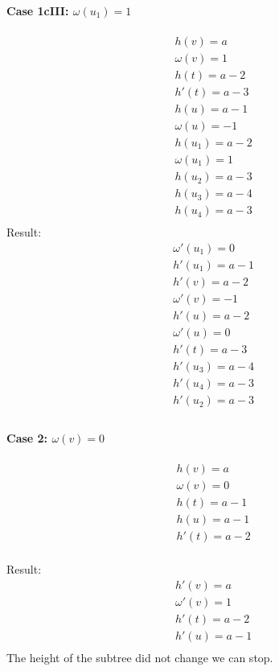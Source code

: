 \paragraph*{\textbf{Case 1cIII}: $\omega(u_1) = 1$}
\[
\begin{split}
& h(v) = a \\
& \omega(v) = 1 \\
& h(t) = a - 2 \\
& h'(t) = a - 3 \\
& h(u) = a - 1 \\
& \omega(u) = - 1 \\
& h(u_1) = a - 2 \\
& \omega(u_1) = 1 \\
& h(u_2) = a - 3 \\
& h(u_3) = a - 4 \\
& h(u_4) = a - 3 \\
\end{split}
\]
Result:
\[
\begin{split}
& \omega'(u_1) = 0 \\
& h'(u_1) = a - 1 \\
& h'(v) = a - 2 \\
& \omega'(v) = -1 \\
& h'(u) = a - 2 \\
& \omega'(u) = 0 \\
& h'(t) = a - 3 \\
& h'(u_3) = a - 4 \\
& h'(u_4) = a - 3 \\
& h'(u_2) = a - 3 \\
\end{split}
\]
\pagebreak

\paragraph*{\textbf{Case 2}: $\omega(v) = 0$}
\[
\begin{split}
& h(v) = a \\
& \omega(v) = 0 \\
& h(t) = a - 1 \\
& h(u) = a - 1 \\
& h'(t) = a - 2 \\
\end{split}
\]

Result:
\[
\begin{split}
& h'(v) = a \\
& \omega'(v) = 1 \\
& h'(t) = a - 2 \\
& h'(u) = a - 1 \\
\end{split}
\]
The height of the subtree did not change we can stop.

